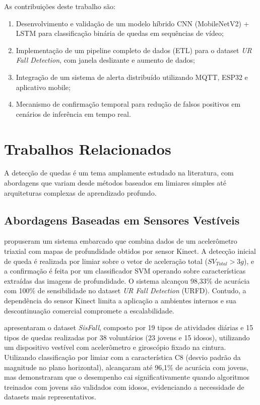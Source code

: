 \documentclass[12pt,a4paper]{article}
\begin{document}
As contribuições deste trabalho são:
\begin{enumerate}[nosep]
  \item Desenvolvimento e validação de um modelo híbrido CNN (MobileNetV2) + LSTM para classificação binária de quedas em sequências de vídeo;
  \item Implementação de um pipeline completo de dados (ETL) para o dataset \textit{UR Fall Detection}, com janela deslizante e aumento de dados;
  \item Integração de um sistema de alerta distribuído utilizando MQTT, ESP32 e aplicativo mobile;
  \item Mecanismo de confirmação temporal para redução de falsos positivos em cenários de inferência em tempo real.
\end{enumerate}

\section{Trabalhos Relacionados}

A detecção de quedas é um tema amplamente estudado na literatura, com abordagens que variam desde métodos baseados em limiares simples até arquiteturas complexas de aprendizado profundo.

\subsection{Abordagens Baseadas em Sensores Vestíveis}

\citet{kwolek2014} propuseram um sistema embarcado que combina dados de um acelerômetro triaxial com mapas de profundidade obtidos por sensor Kinect. A detecção inicial de queda é realizada por limiar sobre o vetor de aceleração total ($SV_{Total} > 3g$), e a confirmação é feita por um classificador SVM operando sobre características extraídas das imagens de profundidade. O sistema alcançou 98,33\% de acurácia com 100\% de sensibilidade no dataset \textit{UR Fall Detection} (URFD). Contudo, a dependência do sensor Kinect limita a aplicação a ambientes internos e sua descontinuação comercial compromete a escalabilidade.

\citet{sisfall2017} apresentaram o dataset \textit{SisFall}, composto por 19 tipos de atividades diárias e 15 tipos de quedas realizadas por 38 voluntários (23 jovens e 15 idosos), utilizando um dispositivo vestível com acelerômetro e giroscópio fixado na cintura. Utilizando classificação por limiar com a característica C8 (desvio padrão da magnitude no plano horizontal), alcançaram até 96,1\% de acurácia com jovens, mas demonstraram que o desempenho cai significativamente quando algoritmos treinados com jovens são validados com idosos, evidenciando a necessidade de datasets mais representativos.
\end{document}
